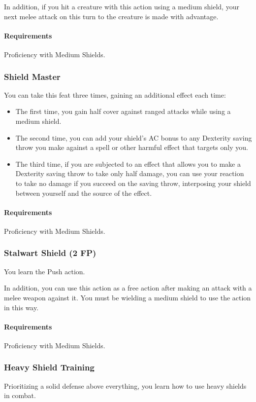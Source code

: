     In addition, if you hit a creature with this action using a medium shield, your next melee attack on this turn to the creature is made with advantage.
    \paragraph{Requirements} Proficiency with Medium Shields.
\subsubsection{Shield Master} \label{feat::shieldmaster}
    You can take this feat three times, gaining an additional effect each time:
    \begin{itemize}
        \item The first time, you gain half cover against ranged attacks while using a medium shield.
        \item The second time, you can add your shield's AC bonus to any Dexterity saving throw you make against a spell or other harmful effect that targets only you.
        \item The third time, if you are subjected to an effect that allows you to make a Dexterity saving throw to take only half damage, you can use your reaction to take no damage if you succeed on the saving throw, interposing your shield between yourself and the source of the effect.
    \end{itemize}
    \paragraph{Requirements} Proficiency with Medium Shields.
\subsubsection{Stalwart Shield (2 FP)} \label{feat::stalwartshield}
    You learn the Push action.

    In addition, you can use this action as a free action after making an attack with a melee weapon against it.
    You must be wielding a medium shield to use the action in this way.
    \paragraph{Requirements} Proficiency with Medium Shields.
\subsubsection{Heavy Shield Training} \label{feat::heavyshieldtraining}
    Prioritizing a solid defense above everything, you learn how to use heavy shields in combat.
